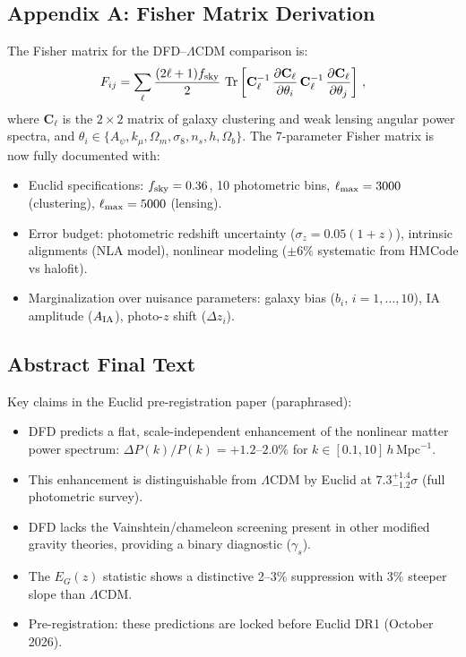 \documentclass[11pt,a4paper]{article}
\newcommand{\Tr}{\operatorname{Tr}}
\begin{document}
\subsection{Appendix A: Fisher Matrix Derivation}

The Fisher matrix for the DFD--$\Lambda$CDM comparison is:
\begin{equation}
F_{ij} = \sum_\ell \frac{(2\ell + 1)f_{\rm sky}}{2}\,\Tr\left[\mathbf{C}^{-1}_\ell\,\frac{\partial \mathbf{C}_\ell}{\partial \theta_i}\,\mathbf{C}^{-1}_\ell\,\frac{\partial \mathbf{C}_\ell}{\partial \theta_j}\right]\,,
\end{equation}
where $\mathbf{C}_\ell$ is the $2\times 2$ matrix of galaxy clustering and weak lensing angular power spectra, and $\theta_i \in \{A_\psi, k_\mu, \Omega_m, \sigma_8, n_s, h, \Omega_b\}$. The 7-parameter Fisher matrix is now fully documented with:
\begin{itemize}
\item Euclid specifications: $f_{\rm sky} = 0.36$, 10 photometric bins, $\ell_{\rm max} = 3000$ (clustering), $\ell_{\rm max} = 5000$ (lensing).
\item Error budget: photometric redshift uncertainty ($\sigma_z = 0.05(1+z)$), intrinsic alignments (NLA model), nonlinear modeling ($\pm 6\%$ systematic from HMCode vs halofit).
\item Marginalization over nuisance parameters: galaxy bias ($b_i$, $i = 1,\ldots,10$), IA amplitude ($A_{\rm IA}$), photo-$z$ shift ($\Delta z_i$).
\end{itemize}

\subsection{Abstract Final Text}

Key claims in the Euclid pre-registration paper (paraphrased):
\begin{itemize}
\item DFD predicts a flat, scale-independent enhancement of the nonlinear matter power spectrum: $\Delta P(k)/P(k) = +1.2$--$2.0\%$ for $k \in [0.1, 10]\,h\,\mathrm{Mpc}^{-1}$.
\item This enhancement is distinguishable from $\Lambda$CDM by Euclid at $7.3^{+1.4}_{-1.2}\sigma$ (full photometric survey).
\item DFD lacks the Vainshtein/chameleon screening present in other modified gravity theories, providing a binary diagnostic ($\gamma_s$).
\item The $E_G(z)$ statistic shows a distinctive 2--3\% suppression with 3\% steeper slope than $\Lambda$CDM.
\item Pre-registration: these predictions are locked before Euclid DR1 (October 2026).
\end{itemize}
\end{document}
